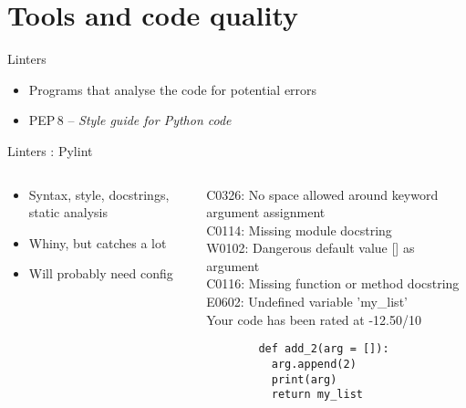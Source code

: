 \section{Tools and code quality}

\begin{frame}{Linters}
    \begin{itemize}
      \item Programs that analyse the code for potential errors
      \item PEP\,8 -- \textit{Style guide for Python code}
    \end{itemize}
\end{frame}

\begin{frame}[fragile]{Linters : Pylint}
  \begin{columns}
    \begin{column}{0.6\linewidth}
      \begin{itemize}
        \item Syntax, style, docstrings, static analysis
        \item Whiny, but catches a lot
        \item Will probably need config
      \end{itemize}
    \end{column}

    \begin{column}{0.4\linewidth}
      {\ttfamily\tiny
        C0326: No space allowed around keyword argument assignment\\
        C0114: Missing module docstring\\
        W0102: Dangerous default value [] as argument\\
        C0116: Missing function or method docstring\\
        E0602: Undefined variable 'my\_list'\\
        Your code has been rated at -12.50/10
      }

      \begin{verbatim}
        def add_2(arg = []):
          arg.append(2)
          print(arg)
          return my_list
      \end{verbatim}
    \end{column}
  \end{columns}
\end{frame}

